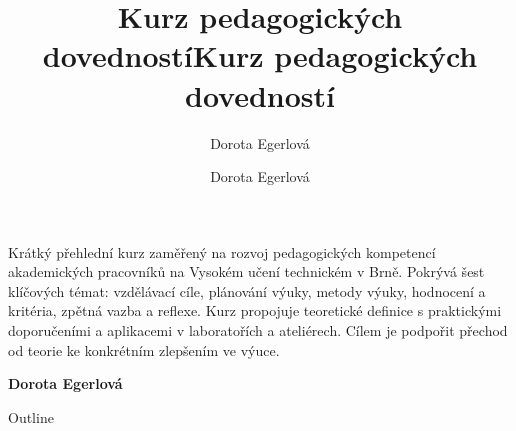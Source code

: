 \documentclass[aspectratio=169]{beamer}
\author{Dorota Egerlová}
\title{Kurz pedagogických dovedností}
\date{}
\begin{document}
\begin{frame}[plain]
\title{Kurz pedagogických dovedností}
\author{Dorota Egerlová}
\maketitle



Krátký přehlední kurz zaměřený na rozvoj pedagogických kompetencí akademických pracovníků na Vysokém učení technickém v Brně. Pokrývá šest klíčových témat: vzdělávací cíle, plánování výuky, metody výuky, hodnocení a kritéria, zpětná vazba a reflexe. Kurz propojuje teoretické definice s praktickými doporučeními a aplikacemi v laboratořích a ateliérech. Cílem je podpořit přechod od teorie ke konkrétním zlepšením ve výuce.



\textbf{Dorota Egerlová}


\end{frame}
\begin{frame}[allowframebreaks]{Outline}
\tableofcontents
\end{frame}
\end{document}
